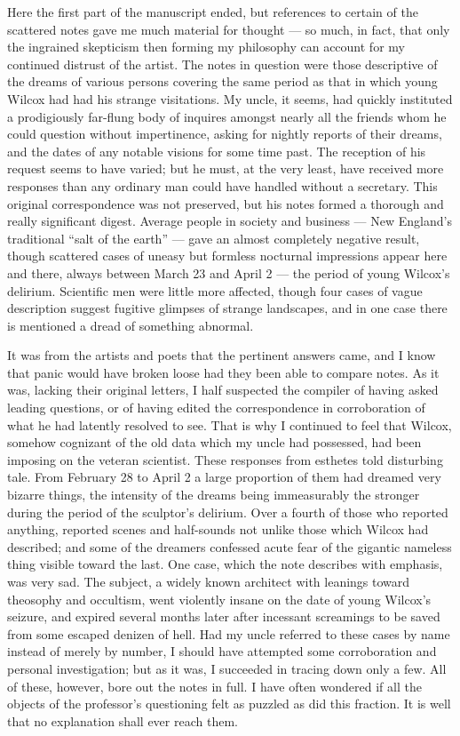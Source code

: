 \begin{pages}
\begin{Leftside}
Here the first part of the manuscript ended, but references to certain
of the scattered notes gave me much material for thought --- so much, in
fact, that only the ingrained skepticism then forming my philosophy can
account for my continued distrust of the artist. The notes in question
were those descriptive of the dreams of various persons covering the
same period as that in which young Wilcox had had his strange
visitations. My uncle, it seems, had quickly instituted a prodigiously
far-flung body of inquires amongst nearly all the friends whom he could
question without impertinence, asking for nightly reports of their
dreams, and the dates of any notable visions for some time past. The
reception of his request seems to have varied; but he must, at the very
least, have received more responses than any ordinary man could have
handled without a secretary. This original correspondence was not
preserved, but his notes formed a thorough and really significant
digest. Average people in society and business --- New England's
traditional ``salt of the earth'' --- gave an almost completely negative
result, though scattered cases of uneasy but formless nocturnal
impressions appear here and there, always between March 23 and April 2 ---
the period of young Wilcox's delirium. Scientific men were little more
affected, though four cases of vague description suggest fugitive
glimpses of strange landscapes, and in one case there is mentioned a
dread of something abnormal.

It was from the artists and poets that the pertinent answers came, and I
know that panic would have broken loose had they been able to compare
notes. As it was, lacking their original letters, I half suspected the
compiler of having asked leading questions, or of having edited the
correspondence in corroboration of what he had latently resolved to see.
That is why I continued to feel that Wilcox, somehow cognizant of the
old data which my uncle had possessed, had been imposing on the veteran
scientist. These responses from esthetes told disturbing tale. From
February 28 to April 2 a large proportion of them had dreamed very
bizarre things, the intensity of the dreams being immeasurably the
stronger during the period of the sculptor's delirium. Over a fourth of
those who reported anything, reported scenes and half-sounds not unlike
those which Wilcox had described; and some of the dreamers confessed
acute fear of the gigantic nameless thing visible toward the last. One
case, which the note describes with emphasis, was very sad. The subject,
a widely known architect with leanings toward theosophy and occultism,
went violently insane on the date of young Wilcox's seizure, and expired
several months later after incessant screamings to be saved from some
escaped denizen of hell. Had my uncle referred to these cases by name
instead of merely by number, I should have attempted some corroboration
and personal investigation; but as it was, I succeeded in tracing down
only a few. All of these, however, bore out the notes in full. I have
often wondered if all the objects of the professor's questioning felt as
puzzled as did this fraction. It is well that no explanation shall ever
reach them.


\end{Leftside}
\end{pages}
